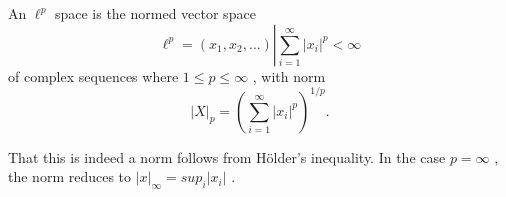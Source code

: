 An $  \ell^p $  space is the normed vector space
 \[  
\ell^p 
= { 
  (x_1,x_2, \ldots)   
  \left |   
  \sum_{i=1}^{\infty} |x_i|^p < \infty 
  \right . 
  } 
\]
of complex sequences where  $ 1 \leq p \leq  \infty  $ , with norm
 \[ | X  |_p =  \left(  \sum_{i=1}^ \infty |x_i|^p  \right)^{1/p}. \]
\par
That this is indeed a norm follows from H\"older's inequality.
In the case  $ p= \infty  $ , the norm reduces to
 $  |x |_ \infty = sup_i |x_i| $ .